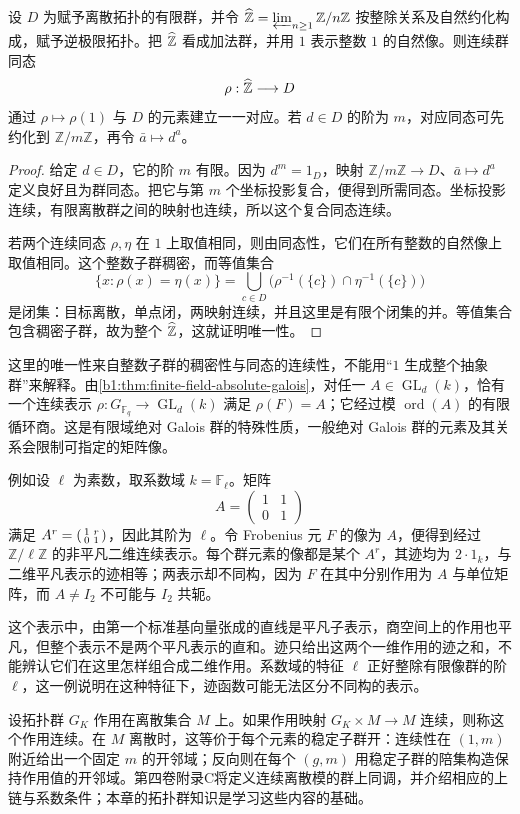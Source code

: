 \begin{proposition}\label{b1:prop:profinite-integer-finite-hom}
	设 \(D\) 为赋予离散拓扑的有限群，并令 \(\widehat{\vphantom{Z}\mathbb Z}=\varprojlim_{n\geq1}\mathbb Z/n\mathbb Z\) 按整除关系及自然约化构成，赋予逆极限拓扑。把 \(\widehat{\vphantom{Z}\mathbb Z}\) 看成加法群，并用 \(1\) 表示整数 \(1\) 的自然像。则连续群同态
	\[
		\rho:\widehat{\vphantom{Z}\mathbb Z}\longrightarrow D
	\]
	通过 \(\rho\mapsto\rho(1)\) 与 \(D\) 的元素建立一一对应。若 \(d\in D\) 的阶为 \(m\)，对应同态可先约化到 \(\mathbb Z/m\mathbb Z\)，再令 \(\bar a\mapsto d^a\)。
\end{proposition}
\begin{proof}
	给定 \(d\in D\)，它的阶 \(m\) 有限。因为 \(d^m=1_D\)，映射 \(\mathbb Z/m\mathbb Z\rightarrow D\)、\(\bar a\mapsto d^a\) 定义良好且为群同态。把它与第 \(m\) 个坐标投影复合，便得到所需同态。坐标投影连续，有限离散群之间的映射也连续，所以这个复合同态连续。

	若两个连续同态 \(\rho,\eta\) 在 \(1\) 上取值相同，则由同态性，它们在所有整数的自然像上取值相同。这个整数子群稠密，而等值集合
	\[
		\{x:\rho(x)=\eta(x)\} =\bigcup_{c\in D}\bigl(\rho^{-1}(\{c\})\cap\eta^{-1}(\{c\})\bigr)
	\]
	是闭集：目标离散，单点闭，两映射连续，并且这里是有限个闭集的并。等值集合包含稠密子群，故为整个 \(\widehat{\vphantom{Z}\mathbb Z}\)，这就证明唯一性。
\end{proof}
这里的唯一性来自整数子群的稠密性与同态的连续性，不能用“\(1\) 生成整个抽象群”来解释。由\cref{b1:thm:finite-field-absolute-galois}，对任一 \(A\in\operatorname{GL}_d(k)\)，恰有一个连续表示 \(\rho:G_{\mathbb F_q}\rightarrow\operatorname{GL}_d(k)\) 满足 \(\rho(F)=A\)；它经过模 \(\operatorname{ord}(A)\) 的有限循环商。这是有限域绝对 Galois 群的特殊性质，一般绝对 Galois 群的元素及其关系会限制可指定的矩阵像。

\ProseParagraphBreak
例如设 \(\ell\) 为素数，取系数域 \(k=\mathbb F_\ell\)。矩阵
\[
	A=\begin{pmatrix}1&1\\0&1\end{pmatrix}
\]
满足 \(A^r=\begin{psmallmatrix}1&r\\0&1\end{psmallmatrix}\)，因此其阶为 \(\ell\)。令 Frobenius 元 \(F\) 的像为 \(A\)，便得到经过 \(\mathbb Z/\ell\mathbb Z\) 的非平凡二维连续表示。每个群元素的像都是某个 \(A^r\)，其迹均为 \(2\cdot1_k\)，与二维平凡表示的迹相等；两表示却不同构，因为 \(F\) 在其中分别作用为 \(A\) 与单位矩阵，而 \(A\ne I_2\) 不可能与 \(I_2\) 共轭。

\ProseParagraphBreak
这个表示中，由第一个标准基向量张成的直线是平凡子表示，商空间上的作用也平凡，但整个表示不是两个平凡表示的直和。迹只给出这两个一维作用的迹之和，不能辨认它们在这里怎样组合成二维作用。系数域的特征 \(\ell\) 正好整除有限像群的阶 \(\ell\)，这一例说明在这种特征下，迹函数可能无法区分不同构的表示。

\ProseParagraphBreak
设拓扑群 \(G_K\) 作用在离散集合 \(M\) 上。如果作用映射 \(G_K\times M\rightarrow M\) 连续，则称这个作用连续。在 \(M\) 离散时，这等价于每个元素的稳定子群开：连续性在 \((1,m)\) 附近给出一个固定 \(m\) 的开邻域；反向则在每个 \((g,m)\) 用稳定子群的陪集构造保持作用值的开邻域。第四卷附录C将定义连续离散模的群上同调，并介绍相应的上链与系数条件；本章的拓扑群知识是学习这些内容的基础。
